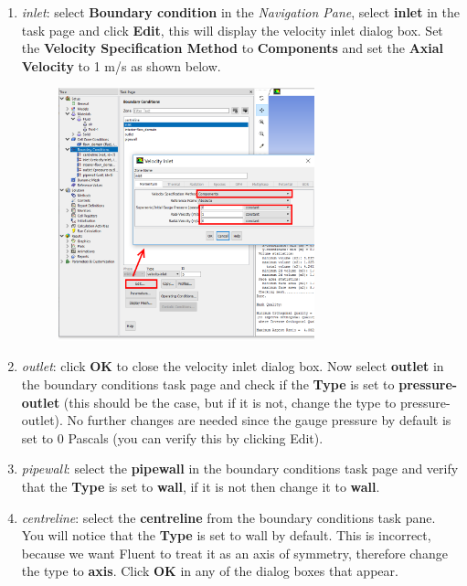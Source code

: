 \documentclass[11pt,a4paper,oneside]{scrartcl}
\newcommand\bfr[1]{\textcolor[rgb]{1,0.00,0.00}{\textbf{\textsf{#1}}}}
\begin{document}
\begin{enumerate}
\item \emph{inlet}: select \bfr{Boundary condition} in the \emph{Navigation Pane}, select \bfr{inlet} in the task page and click \bfr{Edit}, this will display the velocity inlet dialog box. Set the \bfr{Velocity Specification Method} to \bfr{Components} and set the \bfr{Axial Velocity} to 1 m/s as shown below.
\begin{figure}[H]
\begin{center}
\includegraphics[width=0.7\textwidth,clip]{BC_velocity_inlet.png}
\end{center}
\end{figure}
\item \emph{outlet}: click \bfr{OK} to close the velocity inlet dialog box. Now select \bfr{outlet} in the boundary conditions task page and check if the \bfr{Type} is set to \bfr{pressure-outlet} (this should be the case, but if it is not, change the type to pressure-outlet). No further changes are needed since the gauge pressure by default is set to 0 Pascals (you can verify this by clicking Edit).
\item \emph{pipewall}: select the \bfr{pipewall} in the boundary conditions task page and verify that the \bfr{Type} is set to \bfr{wall}, if it is not then change it to \bfr{wall}.
\item \emph{centreline}: select the \bfr{centreline} from the boundary conditions task pane. You will notice that the \bfr{Type} is set to wall by default. This is incorrect, because we want Fluent to treat it as an axis of symmetry, therefore change the type to \bfr{axis}. Click \bfr{OK} in any of the dialog boxes that appear.
    \begin{figure}[H]

\end{figure}
\end{enumerate}
\end{document}
